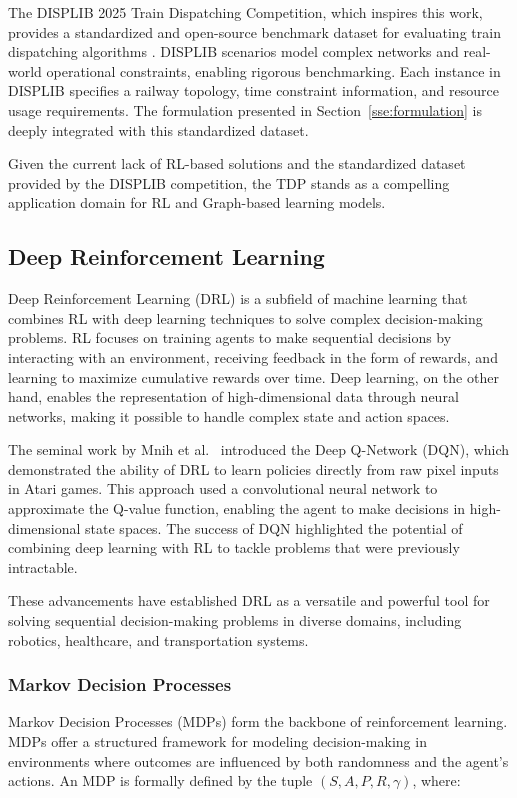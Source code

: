 \documentclass[runningheads]{llncs}
\begin{document}
The DISPLIB 2025 Train Dispatching Competition, which inspires this work, provides a standardized and open-source benchmark dataset for evaluating train dispatching algorithms \cite{train:DISPLIB2025}. 
DISPLIB scenarios model complex networks and real-world operational constraints, enabling rigorous benchmarking. 
Each instance in DISPLIB specifies a railway topology, time constraint information, and resource usage requirements. 
The formulation presented in Section~\ref{sse:formulation} is deeply integrated with this standardized dataset.

Given the current lack of RL-based solutions and the standardized dataset provided by the DISPLIB competition, the TDP stands as a compelling application domain for RL and Graph-based learning models.

\subsection{Deep Reinforcement Learning}
\label{sss:reinforcement_learning}
Deep Reinforcement Learning (DRL) is a subfield of machine learning that combines RL with deep learning techniques to solve complex decision-making problems. 
RL focuses on training agents to make sequential decisions by interacting with an environment, receiving feedback in the form of rewards, and learning to maximize cumulative rewards over time. 
Deep learning, on the other hand, enables the representation of high-dimensional data through neural networks, making it possible to handle complex state and action spaces.

The seminal work by Mnih et al.~\cite{drl:Mnih13} introduced the Deep Q-Network (DQN), which demonstrated the ability of DRL to learn policies directly from raw pixel inputs in Atari games. 
This approach used a convolutional neural network to approximate the Q-value function, enabling the agent to make decisions in high-dimensional state spaces. 
The success of DQN highlighted the potential of combining deep learning with RL to tackle problems that were previously intractable.

These advancements have established DRL as a versatile and powerful tool for solving sequential decision-making problems in diverse domains, including robotics, healthcare, and transportation systems.
\subsubsection{Markov Decision Processes}
Markov Decision Processes (MDPs) form the backbone of reinforcement learning. 
MDPs offer a structured framework for modeling decision-making in environments where outcomes are influenced by both randomness and the agent's actions. 
An MDP is formally defined by the tuple $(S, A, P, R, \gamma)$, where:
\end{document}
